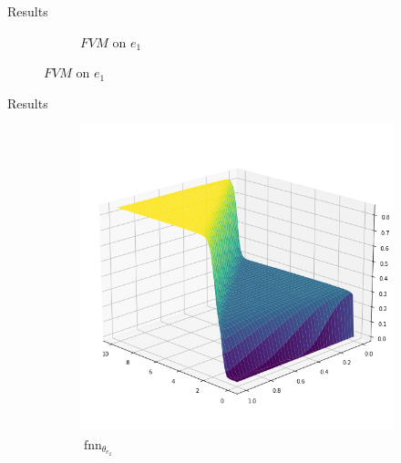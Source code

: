 \documentclass[9pt]{beamer}
\begin{document}
\begin{frame}{Results}
\begin{figure}[H]
\begin{center}
\begin{subfigure}[b]{0.4\textwidth}
\begin{center}
                \end{center}
                \caption{$FVM$ on $e_1$}
            \end{subfigure}
        \end{center}
    \end{figure}
\end{frame}



\begin{frame}{Results}
    \begin{figure}[H]
        \begin{center}
            \begin{subfigure}[b]{0.4\textwidth}
                \begin{center}
                    \includegraphics[scale=0.25]{img/Kante2.png}
                \end{center}
                \caption{$\operatorname{fnn}_{\theta_{e_2}}$}
            \end{subfigure} \hspace{10mm}
            \begin{subfigure}[b]{0.4\textwidth}
                \begin{center}

\end{center}
\end{subfigure}
\end{center}
\end{figure}
\end{frame}
\end{document}
